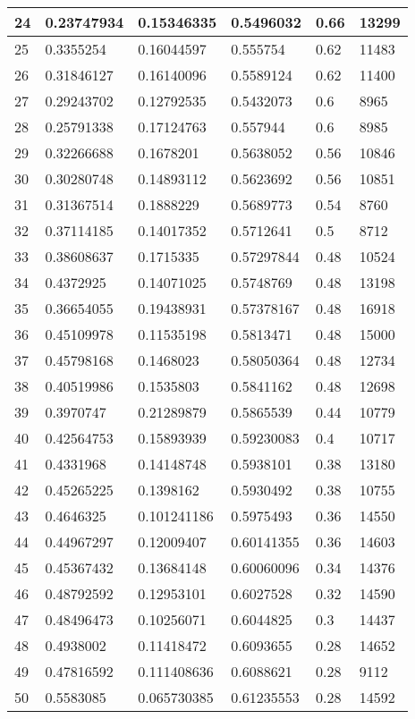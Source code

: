 \begin{longtable}{|l|l|l|l|l|l|}
24 & 0.23747934 & 0.15346335 & 0.5496032 & 0.66 & 13299 \\ \hline 
25 & 0.3355254 & 0.16044597 & 0.555754 & 0.62 & 11483 \\ \hline 
26 & 0.31846127 & 0.16140096 & 0.5589124 & 0.62 & 11400 \\ \hline 
27 & 0.29243702 & 0.12792535 & 0.5432073 & 0.6 & 8965 \\ \hline 
28 & 0.25791338 & 0.17124763 & 0.557944 & 0.6 & 8985 \\ \hline 
29 & 0.32266688 & 0.1678201 & 0.5638052 & 0.56 & 10846 \\ \hline 
30 & 0.30280748 & 0.14893112 & 0.5623692 & 0.56 & 10851 \\ \hline 
31 & 0.31367514 & 0.1888229 & 0.5689773 & 0.54 & 8760 \\ \hline 
32 & 0.37114185 & 0.14017352 & 0.5712641 & 0.5 & 8712 \\ \hline 
33 & 0.38608637 & 0.1715335 & 0.57297844 & 0.48 & 10524 \\ \hline 
34 & 0.4372925 & 0.14071025 & 0.5748769 & 0.48 & 13198 \\ \hline 
35 & 0.36654055 & 0.19438931 & 0.57378167 & 0.48 & 16918 \\ \hline 
36 & 0.45109978 & 0.11535198 & 0.5813471 & 0.48 & 15000 \\ \hline 
37 & 0.45798168 & 0.1468023 & 0.58050364 & 0.48 & 12734 \\ \hline 
38 & 0.40519986 & 0.1535803 & 0.5841162 & 0.48 & 12698 \\ \hline 
39 & 0.3970747 & 0.21289879 & 0.5865539 & 0.44 & 10779 \\ \hline 
40 & 0.42564753 & 0.15893939 & 0.59230083 & 0.4 & 10717 \\ \hline 
41 & 0.4331968 & 0.14148748 & 0.5938101 & 0.38 & 13180 \\ \hline 
42 & 0.45265225 & 0.1398162 & 0.5930492 & 0.38 & 10755 \\ \hline 
43 & 0.4646325 & 0.101241186 & 0.5975493 & 0.36 & 14550 \\ \hline 
44 & 0.44967297 & 0.12009407 & 0.60141355 & 0.36 & 14603 \\ \hline 
45 & 0.45367432 & 0.13684148 & 0.60060096 & 0.34 & 14376 \\ \hline 
46 & 0.48792592 & 0.12953101 & 0.6027528 & 0.32 & 14590 \\ \hline 
47 & 0.48496473 & 0.10256071 & 0.6044825 & 0.3 & 14437 \\ \hline 
48 & 0.4938002 & 0.11418472 & 0.6093655 & 0.28 & 14652 \\ \hline 
49 & 0.47816592 & 0.111408636 & 0.6088621 & 0.28 & 9112 \\ \hline 
50 & 0.5583085 & 0.065730385 & 0.61235553 & 0.28 & 14592 \\ \hline 
\end{longtable}